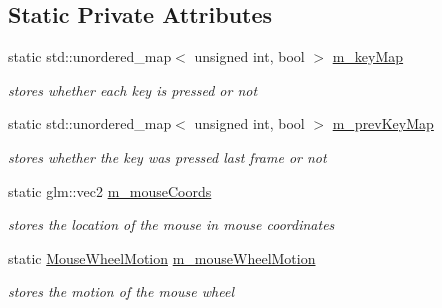 \subsection*{Static Private Attributes}
\begin{DoxyCompactItemize}
\item 
\mbox{\label{classnta_1_1InputManager_a00aa67b739a6762219dc97cc2e23c3f5}} 
static std\+::unordered\+\_\+map$<$ unsigned int, bool $>$ \hyperlink{classnta_1_1InputManager_a00aa67b739a6762219dc97cc2e23c3f5}{m\+\_\+key\+Map}
\begin{DoxyCompactList}\small\item\em stores whether each key is pressed or not \end{DoxyCompactList}\item 
\mbox{\label{classnta_1_1InputManager_a5fef83321ad801f59f5a4f3b2542db47}} 
static std\+::unordered\+\_\+map$<$ unsigned int, bool $>$ \hyperlink{classnta_1_1InputManager_a5fef83321ad801f59f5a4f3b2542db47}{m\+\_\+prev\+Key\+Map}
\begin{DoxyCompactList}\small\item\em stores whether the key was pressed last frame or not \end{DoxyCompactList}\item 
\mbox{\label{classnta_1_1InputManager_a9f0b4d6c78182a49313144c712cb460e}} 
static glm\+::vec2 \hyperlink{classnta_1_1InputManager_a9f0b4d6c78182a49313144c712cb460e}{m\+\_\+mouse\+Coords}
\begin{DoxyCompactList}\small\item\em stores the location of the mouse in mouse coordinates \end{DoxyCompactList}\item 
\mbox{\label{classnta_1_1InputManager_ae66e8c723d33a51ece6700e266191f01}} 
static \hyperlink{namespacenta_aabafd53ba7264997db9e6e934a8ade2b}{Mouse\+Wheel\+Motion} \hyperlink{classnta_1_1InputManager_ae66e8c723d33a51ece6700e266191f01}{m\+\_\+mouse\+Wheel\+Motion}
\begin{DoxyCompactList}\small\item\em stores the motion of the mouse wheel \end{DoxyCompactList}\end{DoxyCompactItemize}


